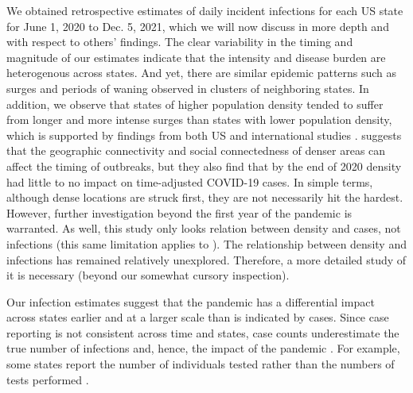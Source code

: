 \documentclass{article}
\begin{document}
We obtained retrospective estimates of daily incident infections for each US state for June 1, 2020 to Dec. 5, 2021, which we will now discuss in more depth and with respect to others' findings. The clear variability in the timing and magnitude of our estimates indicate that the intensity and disease burden are heterogenous across states. And yet, there are similar epidemic patterns such as surges and periods of waning observed in clusters of neighboring states. In addition, we observe that states of higher population density tended to suffer from longer and more intense surges than states with lower population density, which is supported by findings from both US and international studies \citep{carozzi2022urban, iderus2022correlation, wong2020spreading}. \citet{carozzi2022urban} suggests that the geographic connectivity and social connectedness of denser areas can affect the timing of outbreaks, but they also find that by the end of 2020 density had little to no impact on time-adjusted COVID-19 cases. In simple terms, although dense locations are struck first, they are not necessarily hit the hardest. However, further investigation beyond the first year of the pandemic is warranted. As well, this study only looks relation between density and cases, not infections (this same limitation applies to \citet{jalal2021prominent}). The relationship between density and infections has remained relatively unexplored. Therefore, a more detailed study of it is necessary (beyond our somewhat cursory inspection). %

Our infection estimates suggest that the pandemic has a differential impact across states earlier and at a larger scale than is indicated by cases. Since case reporting is not consistent across time and states, case counts underestimate the true number of infections and, hence, the impact of the pandemic \citep{cdc2022estimated, simon2022inconsistent}. For example, some states report the number of individuals tested rather than the numbers of tests performed \citep{schechtman2020counting, chitwood2021reconstructing}.
\end{document}
